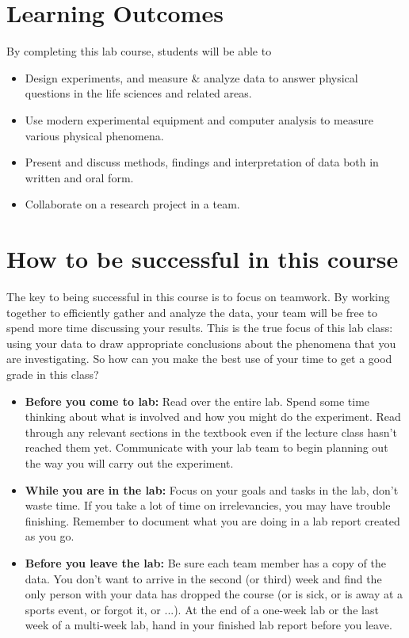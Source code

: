 \section*{Learning Outcomes}
By completing this lab course, students will be able to
\begin{itemize}
\item Design experiments, and measure \& analyze data to answer physical questions in the life sciences and related areas.
\item Use modern experimental equipment and computer analysis to measure various physical phenomena.
\item Present and discuss methods, findings and interpretation of data both in written and oral form.
\item Collaborate on a research project in a team.
\end{itemize}

\section*{How to be successful in this course}
The key to being successful in this course is to focus on teamwork.
By working together to efficiently gather and analyze the data, your team will be free to spend more time discussing your results.
This is the true focus of this lab class: using your data to draw appropriate conclusions about the phenomena that you are investigating.
So how can you make the best use of your time to get a good grade in this class?
\begin{itemize}
	\setlength\itemsep{2pt}
	\item \textbf{Before you come to lab:} Read over the entire lab.
	Spend some time thinking about what is involved and how you might do the experiment.
	Read through any relevant sections in the textbook even if the lecture class hasn't reached them yet.
	Communicate with your lab team to begin planning out the way you will carry out the experiment.
	\item \textbf{While you are in the lab:} Focus on your goals and tasks in the lab, don't waste time.
	If you take a lot of time on irrelevancies, you may have trouble finishing.
	Remember to document what you are doing in a lab report created as you go.
	\item \textbf{Before you leave the lab:} Be sure each team member has a copy of the data.
	You don't want to arrive in the second (or third) week and find the only person with your data has dropped the course (or is sick, or is away at a sports event, or forgot it, or ...).
	At the end of a one-week lab or the last week of a multi-week lab, hand in your finished lab report before you leave.
\end{itemize}

